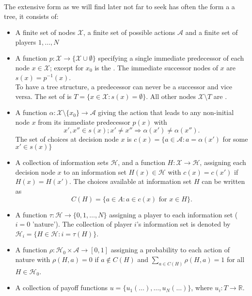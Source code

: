 The extensive form as we will find later not far to seek has often the form a a tree, it consists of:
\begin{itemize} 
	\item A finite set of nodes $\mathcal{X}$, a finite set of possible actions $\mathcal{A}$ and a finite set of players ${1, \dotsc, N}$
	\item A function $p \colon \mathcal{X} \rightarrow \{ \mathcal{X} \cup \emptyset \}$ specifying a single immediate predecessor of each node $x \in \mathcal{X}$; except for $x_{0}$ is the . The immediate successor nodes of $x$ are $s(x) = p^{-1}(x)$. \\
		To have a tree structure, a predecessor can never be a successor and vice versa. The set of  is $T = \{ x \in \mathcal{X}: s(x) = \emptyset \}$. All other nodes $\mathcal{X} \setminus T$ are .
	\item A function $\alpha \colon \mathcal{X} \setminus \{ x_{0} \} \rightarrow \mathcal{A}$ giving the action that leads to any non-initial node $x$ from its immediate predecessor $p(x)$ with
		\[ x', x'' \in s(x); x' \neq x'' \Rightarrow \alpha(x') \neq \alpha(x''). \]
		The set of choices at decision node $x$ is $c(x) = \{ a \in \mathcal{A} : a = \alpha(x')$ for some $x' \in s(x) \}$
	\item A collection of information sets $\mathcal{H}$, and a function $H : \mathcal{X} \rightarrow \mathcal{H}$, assigning each decision node $x$ to an information set $H(x) \in \mathcal{H}$ with $c(x) = c(x')$ if $H(x) = H(x')$.
		The choices available at information set $H$ can be written as
		\[ C(H) = \{a \in A : a \in c(x) \text{ for } x \in H \}. \]
	\item A function $\tau : \mathcal{H} \rightarrow \{0, 1, \dotsc, N \}$ assigning a player to each information set ($i = 0$ 'nature').
		The collection of player $i$'s information set is denoted by $\mathcal{H}_i = \{H \in \mathcal{H} : i = \tau(H) \}$.
	\item A function $\rho : \mathcal{H}_{0} \times \mathcal{A} \rightarrow [0, 1]$ assigning a probability to each action of nature with $ \rho (H,a) = 0$ if $a \notin C(H)$ and $\sum_{a \in C(H)} \rho(H,a) = 1$ for all $H \in \mathcal{H}_{0}$.
	\item A collection of payoff functions $u = \{ u_{1}(\dotsc), \dotsc, u_{N} (\dotsc) \}$, where $u_{i} \colon T \rightarrow \mathds{R}$.
\end{itemize}

